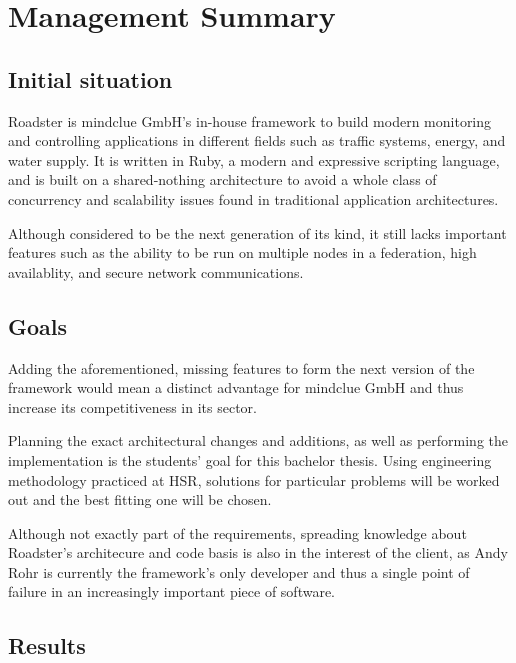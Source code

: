 \part{Management Summary}\label{part:mgmtsummary}
\chapter*{Initial situation}
Roadster is mindclue GmbH's in-house framework to build modern monitoring and
controlling applications in different fields such as traffic systems, energy,
and water supply. It is written in Ruby, a modern and expressive scripting
language, and is built on a shared-nothing architecture to avoid a whole class
of concurrency and scalability issues found in traditional application
architectures.

Although considered to be the next generation of its kind, it still lacks
important features such as the ability to be run on multiple
nodes in a federation, high availablity, and secure network communications.

\chapter*{Goals}
Adding the aforementioned, missing features to form the next version of the
framework would mean a distinct advantage for mindclue GmbH and thus increase
its competitiveness in its sector.

Planning the exact architectural changes and additions, as well as performing
the implementation is the students' goal for this bachelor thesis. Using
engineering methodology practiced at HSR, solutions for particular problems
will be worked out and the best fitting one will be chosen.

Although not exactly part of the requirements, spreading knowledge about Roadster's
architecure and code basis is also in the interest of the client, as Andy Rohr
is currently the framework's only developer and thus a single point of failure
in an increasingly important piece of software.

\chapter*{Results}
